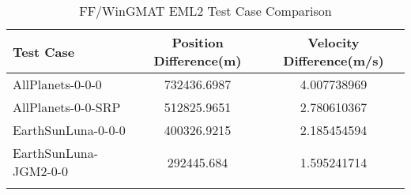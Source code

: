 \begin{table}[htbp!]
\centering
\caption{ FF/WinGMAT EML2 Test Case Comparison}
      \begin{tabular}{lcc}
      \hline\hline
          Test Case & Position Difference(m) & Velocity Difference(m/s) \\
         \hline
         AllPlanets-0-0-0 & 732436.6987 & 4.007738969 \\
         AllPlanets-0-0-SRP & 512825.9651 & 2.780610367 \\
         EarthSunLuna-0-0-0 & 400326.9215 & 2.185454594 \\
         EarthSunLuna-JGM2-0-0 & 292445.684 & 1.595241714 \\
      \hline\hline
      \label{Table: EML2 FF-WinGMAT Table} 
\end{tabular}
\end{table}
